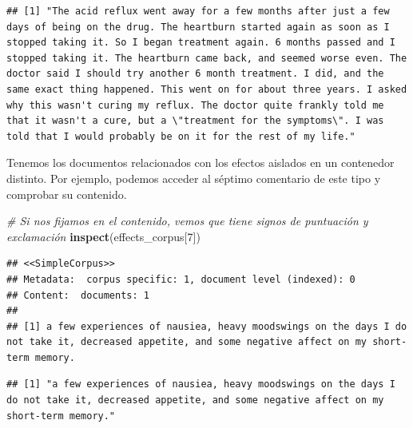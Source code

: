 \documentclass[spanish,]{article}
\newenvironment{Shaded}{\begin{snugshade}}{\end{snugshade}}
\newcommand{\KeywordTok}[1]{\textcolor[rgb]{0.13,0.29,0.53}{\textbf{#1}}}
\newcommand{\DecValTok}[1]{\textcolor[rgb]{0.00,0.00,0.81}{#1}}
\newcommand{\CommentTok}[1]{\textcolor[rgb]{0.56,0.35,0.01}{\textit{#1}}}
\newcommand{\OperatorTok}[1]{\textcolor[rgb]{0.81,0.36,0.00}{\textbf{#1}}}
\newcommand{\NormalTok}[1]{#1}
\begin{document}
\begin{Shaded}
\end{Shaded}

\begin{verbatim}
## [1] "The acid reflux went away for a few months after just a few days of being on the drug. The heartburn started again as soon as I stopped taking it. So I began treatment again. 6 months passed and I stopped taking it. The heartburn came back, and seemed worse even. The doctor said I should try another 6 month treatment. I did, and the same exact thing happened. This went on for about three years. I asked why this wasn't curing my reflux. The doctor quite frankly told me that it wasn't a cure, but a \"treatment for the symptoms\". I was told that I would probably be on it for the rest of my life."
\end{verbatim}

Tenemos los documentos relacionados con los efectos aislados en un
contenedor distinto. Por ejemplo, podemos acceder al séptimo comentario
de este tipo y comprobar su contenido.

\begin{Shaded}
\begin{Highlighting}[]
\CommentTok{# Si nos fijamos en el contenido, vemos que tiene signos de puntuación y exclamación}
\KeywordTok{inspect}\NormalTok{(effects_corpus[}\DecValTok{7}\NormalTok{])}
\end{Highlighting}
\end{Shaded}

\begin{verbatim}
## <<SimpleCorpus>>
## Metadata:  corpus specific: 1, document level (indexed): 0
## Content:  documents: 1
## 
## [1] a few experiences of nausiea, heavy moodswings on the days I do not take it, decreased appetite, and some negative affect on my short-term memory.
\end{verbatim}

\begin{Shaded}
\end{Shaded}

\begin{verbatim}
## [1] "a few experiences of nausiea, heavy moodswings on the days I do not take it, decreased appetite, and some negative affect on my short-term memory."
\end{verbatim}
\end{document}
